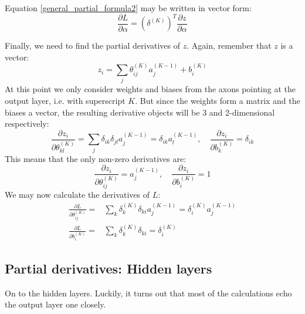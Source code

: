 \documentclass[12pt, a4paper]{article}
\numberwithin{equation}{section}
\begin{document}
Equation \ref{general_partial_formula2} may be written in vector form:
\begin{equation}
\frac{\partial L}{\partial\alpha}=\left(\delta^{(K)}\right)^T\frac{\partial z}{\partial\alpha}
\end{equation}

Finally, we need to find the partial derivatives of $z$. Again, remember that $z$ is a vector:
\begin{equation}
z_i=\sum_j\theta^{(K)}_{ij}a^{(K-1)}_j+b^{(K)}_i
\end{equation}
At this point we only consider weights and biases from the axons pointing at the output layer, i.e. with superscript $K$. But since the weights form a matrix and the biases a vector, the resulting derivative objects will be 3 and 2-dimensional respectively:
\begin{equation}
\frac{\partial z_i}{\partial\theta^{(K)}_{kl}}=\sum_j\delta_{ik}\delta_{jl}a^{(K-1)}_j=\delta_{ik}a^{(K-1)}_l,\quad\frac{\partial z_i}{\partial b^{(K)}_k}=\delta_{ik}
\end{equation}
This means that the only non-zero derivatives are:
\begin{equation}
\frac{\partial z_i}{\partial\theta^{(K)}_{ij}}=a^{(K-1)}_j,\quad\frac{\partial z_i}{\partial b^{(K)}_i}=1
\end{equation}
We may now calculate the derivatives of $L$:
\begin{align}
\label{weight_derivative}
\frac{\partial L}{\partial\theta^{(K)}_{ij}}=&\sum_k\delta^{(K)}_k\delta_{ki}a^{(K-1)}_j=\delta^{(K)}_i a^{(K-1)}_j\\
\label{bias_derivative}
\frac{\partial L}{\partial b^{(K)}_i}=&\sum_k\delta^{(K)}_k\delta_{ki}=\delta^{(K)}_i
\end{align}

\subsection{Partial derivatives: Hidden layers}
On to the hidden layers. Luckily, it turns out that most of the calculations echo the output layer one closely.
\end{document}
